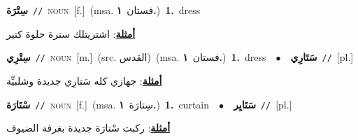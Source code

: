 \documentclass[10pt,a4paper,twoside]{article} %
\begin{document}
\begin{multicols}{2}
{\setlength\topsep{0pt}\textbf{\foreignlanguage{arabic}{سِتْرَة}}\ {\color{gray}\texttt{//}\color{black}}\ \textsc{noun}\ [f.]\ \color{gray}(msa. \foreignlanguage{arabic}{فستان}~\foreignlanguage{arabic}{\textbf{١.}})\color{black}\ \textbf{1.}~dress\  \begin{flushright}\color{gray}\foreignlanguage{arabic}{\textbf{\underline{\foreignlanguage{arabic}{أمثلة}}}: اشتريتلك سترة حلوة كتير}\end{flushright}\color{black}} \vspace{2mm}

{\setlength\topsep{0pt}\textbf{\foreignlanguage{arabic}{سِتْرِي}}\ {\color{gray}\texttt{//}\color{black}}\ \textsc{noun}\ [m.]\ (src. \color{gray}\foreignlanguage{arabic}{القدس}\color{black})\ \color{gray}(msa. \foreignlanguage{arabic}{فستان}~\foreignlanguage{arabic}{\textbf{١.}})\color{black}\ \textbf{1.}~dress\ \ $\bullet$\ \ \setlength\topsep{0pt}\textbf{\foreignlanguage{arabic}{سَتَارِي}}\ {\color{gray}\texttt{//}\color{black}}\ [pl.]\  \begin{flushright}\color{gray}\foreignlanguage{arabic}{\textbf{\underline{\foreignlanguage{arabic}{أمثلة}}}: جهازي كله سَتارِي جديدة وشلبيِّة}\end{flushright}\color{black}} \vspace{2mm}

{\setlength\topsep{0pt}\textbf{\foreignlanguage{arabic}{سْتَارَة}}\ {\color{gray}\texttt{//}\color{black}}\ \textsc{noun}\ [f.]\ \color{gray}(msa. \foreignlanguage{arabic}{سِتارَة}~\foreignlanguage{arabic}{\textbf{١.}})\color{black}\ \textbf{1.}~curtain\ \ $\bullet$\ \ \setlength\topsep{0pt}\textbf{\foreignlanguage{arabic}{سَتَايِر}}\ {\color{gray}\texttt{//}\color{black}}\ [pl.]\  \begin{flushright}\color{gray}\foreignlanguage{arabic}{\textbf{\underline{\foreignlanguage{arabic}{أمثلة}}}: ركبت سْتارَة جديدة بغرفة الضيوف}\end{flushright}\color{black}} \vspace{2mm}


\end{multicols}
\end{document}
